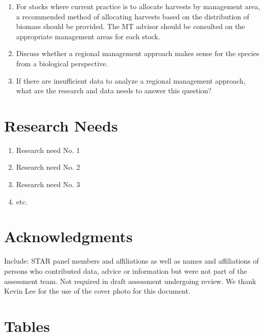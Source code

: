 \documentclass[12pt,]{article}
\providecommand{\tightlist}{%
  \setlength{\itemsep}{0pt}\setlength{\parskip}{0pt}}
\begin{document}
\begin{enumerate}
\def\labelenumi{\arabic{enumi}.}
\tightlist
\item
  For stocks where current practice is to allocate harvests by
  management area, a recommended method of allocating harvests based on
  the distribution of biomass should be provided. The MT advisor should
  be consulted on the appropriate management areas for each stock.
\item
  Discuss whether a regional management approach makes sense for the
  species from a biological perspective.
\item
  If there are insufficient data to analyze a regional management
  approach, what are the research and data needs to answer this
  question?
\end{enumerate}

\section{Research Needs}\label{research-needs}

\begin{enumerate}

\item Research need No. 1

\item Research need No. 2

\item Research need No. 3

\item etc.

\end{enumerate}

\section{Acknowledgments}\label{acknowledgments}

Include: STAR panel members and affiliations as well as names and
affiliations of persons who contributed data, advice or information but
were not part of the assessment team. Not required in draft assessment
undergoing review. We thank Kevin Lee for the use of the cover photo for
this document.

\newpage

\FloatBarrier

\section{Tables}\label{tables}
\end{document}
